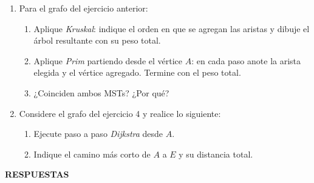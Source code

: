 \documentclass[12pt]{article}
\begin{document}
\begin{titlepage}
\begin{enumerate}[leftmargin=*]
        \item Para el grafo del ejercicio anterior:
        \begin{enumerate}[label=\alph*)]
          \item Aplique \emph{Kruskal}: indique el orden en que se agregan las aristas y dibuje el árbol resultante con su peso total.
          \item Aplique \emph{Prim} partiendo desde el vértice \(A\): en cada paso anote la arista elegida y el vértice agregado. Termine con el peso total.
          \item ¿Coinciden ambos MSTs? ¿Por qué?
        \end{enumerate}

        \item Considere el grafo del ejercicio 4 y realice lo siguiente:
        \begin{enumerate}[label=\alph*)]
          \item Ejecute paso a paso \emph{Dijkstra} desde \(A\).
          \item Indique el camino más corto de \(A\) a \(E\) y su distancia total.
        \end{enumerate}
    \end{enumerate}
  \end{titlepage}

  \newpage
      \begin{center}
          \textbf{RESPUESTAS}
      \end{center}
\end{document}

